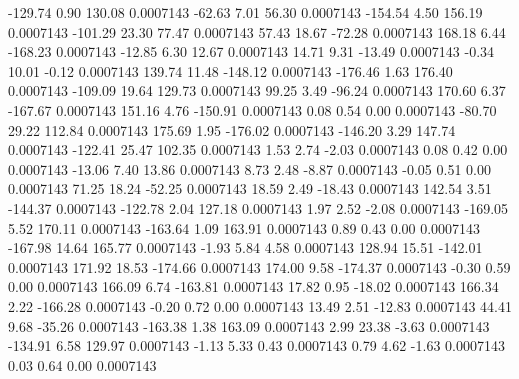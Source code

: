      -129.74        0.90      130.08     0.0007143
      -62.63        7.01       56.30     0.0007143
     -154.54        4.50      156.19     0.0007143
     -101.29       23.30       77.47     0.0007143
       57.43       18.67      -72.28     0.0007143
      168.18        6.44     -168.23     0.0007143
      -12.85        6.30       12.67     0.0007143
       14.71        9.31      -13.49     0.0007143
       -0.34       10.01       -0.12     0.0007143
      139.74       11.48     -148.12     0.0007143
     -176.46        1.63      176.40     0.0007143
     -109.09       19.64      129.73     0.0007143
       99.25        3.49      -96.24     0.0007143
      170.60        6.37     -167.67     0.0007143
      151.16        4.76     -150.91     0.0007143
        0.08        0.54        0.00     0.0007143
      -80.70       29.22      112.84     0.0007143
      175.69        1.95     -176.02     0.0007143
     -146.20        3.29      147.74     0.0007143
     -122.41       25.47      102.35     0.0007143
        1.53        2.74       -2.03     0.0007143
        0.08        0.42        0.00     0.0007143
      -13.06        7.40       13.86     0.0007143
        8.73        2.48       -8.87     0.0007143
       -0.05        0.51        0.00     0.0007143
       71.25       18.24      -52.25     0.0007143
       18.59        2.49      -18.43     0.0007143
      142.54        3.51     -144.37     0.0007143
     -122.78        2.04      127.18     0.0007143
        1.97        2.52       -2.08     0.0007143
     -169.05        5.52      170.11     0.0007143
     -163.64        1.09      163.91     0.0007143
        0.89        0.43        0.00     0.0007143
     -167.98       14.64      165.77     0.0007143
       -1.93        5.84        4.58     0.0007143
      128.94       15.51     -142.01     0.0007143
      171.92       18.53     -174.66     0.0007143
      174.00        9.58     -174.37     0.0007143
       -0.30        0.59        0.00     0.0007143
      166.09        6.74     -163.81     0.0007143
       17.82        0.95      -18.02     0.0007143
      166.34        2.22     -166.28     0.0007143
       -0.20        0.72        0.00     0.0007143
       13.49        2.51      -12.83     0.0007143
       44.41        9.68      -35.26     0.0007143
     -163.38        1.38      163.09     0.0007143
        2.99       23.38       -3.63     0.0007143
     -134.91        6.58      129.97     0.0007143
       -1.13        5.33        0.43     0.0007143
        0.79        4.62       -1.63     0.0007143
        0.03        0.64        0.00     0.0007143
